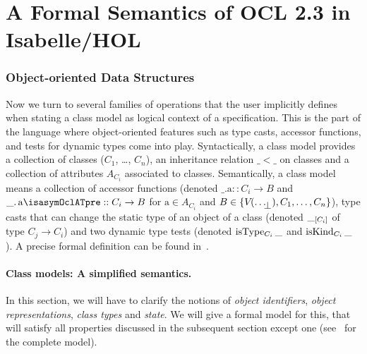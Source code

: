 \part{A Formal Semantics of OCL 2.3 in Isabelle/HOL}

\section{Object-oriented Data Structures}%
Now we turn to several families of operations that the user implicitly defines
when stating a class model as logical context of a specification. This is the
part of the language where object-oriented features such as type casts, accessor
functions, and tests for dynamic types come into play. Syntactically, a class
model provides a collection of classes ($C_1$, \ldots, $C_n$),
an inheritance relation $\_ < \_$ on
classes and a collection of attributes $A_{C_i}$ associated to classes.  Semantically,
a class model means a collection of accessor functions (denoted $\_\text{.a}::C_i
\rightarrow B$ and $\getAttrib{\_}{a\isasymOclATpre}::C_i \rightarrow B$ for
$\text{a}\in A_{C_i}$ and $B\in \{\V{}{\up{\ldots}}, C_1, \ldots, C_n\}$),
type casts that can change the static type of an object of a class
(denoted $\typeCast{\_}{\text{$C_i$}}$ of type $C_j \rightarrow C_i$) and
two dynamic type tests
(denoted $\isType{\text{$C_i$}}{\_}$ and $\isKind{\text{$C_i$}}{\_}$ ).
A precise formal definition can be found in~\cite{brucker.ea:semantics:2009}.

\subsection{Class models: A simplified semantics.}
In this section, we will have to clarify the notions of \emph{object
  identifiers}, \emph{object representations}, \emph{class types} and
\emph{state}. We will give a formal model for this, that will satisfy all
properties discussed in the subsequent section except one
(see~\cite{brucker.ea:extensible:2008-b} for the complete model).

